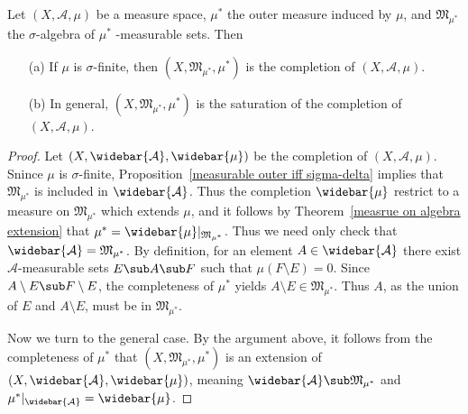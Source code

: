 \begin{proposition}\label{measure outer measurable completion}
Let $(X,\mathcal{A},\mu)$ be a measure space, $\mu^*$ the outer measure induced by $\mu$, and $\mathfrak{M}_{\mu^*}$ the $\sigma$-algebra of $\mu^*$ -measurable sets. Then
\begin{itemize}
\item[(a)] If $\mu$ is $\sigma$-finite, then $(X,\mathfrak{M}_{\mu^*},\mu^*)$ is the completion of $(X,\mathcal{A},\mu)$.
\item[(b)] In general, $(X,\mathfrak{M}_{\mu^*},\mu^*)$ is the saturation of the completion of $(X,\mathcal{A},\mu)$.
\end{itemize}
\end{proposition}
\begin{proof}
Let $(X,\widebar{\mathcal{A}},\widebar{\mu})$ be the completion of $(X,\mathcal{A},\mu)$. Snince $\mu$ is $\sigma$-finite, Proposition~\ref{measurable outer iff sigma-delta} implies that $\mathfrak{M}_{\mu^*}$ is included in $\widebar{\mathcal{A}}$. Thus the completion $\widebar{\mu}$ restrict to a measure on $\mathfrak{M}_{\mu^*}$ which extends $\mu$, and it follows by Theorem~\ref{measrue on algebra extension} that $\mu^*=\widebar{\mu}|_{\mathfrak{M}_{\mu^*}}$. Thus we need only check that $\widebar{\mathcal{A}}=\mathfrak{M}_{\mu^*}$. By definition, for an element $A\in\widebar{\mathcal{A}}$ there exist $\mathcal{A}$-measurable sets $E\sub A\sub F$ such that $\mu(F\setminus E)=0$. Since $A\setminus E\sub F\setminus E$, the completeness of $\mu^*$ yields $A\setminus E\in\mathfrak{M}_{\mu^*}$. Thus $A$, as the union of $E$ and $A\setminus E$, must be in $\mathfrak{M}_{\mu^*}$.\par
Now we turn to the general case. By the argument above, it follows from the completeness of $\mu^*$ that $(X,\mathfrak{M}_{\mu^*},\mu^*)$ is an extension of $(X,\widebar{\mathcal{A}},\widebar{\mu})$, meaning $\widebar{\mathcal{A}}\sub\mathfrak{M}_{\mu^*}$ and $\mu^*|_{\widebar{\mathcal{A}}}=\widebar{\mu}$.\par

\end{proof}
